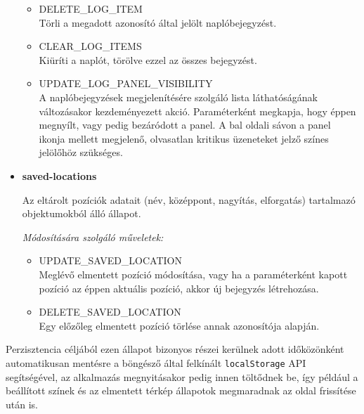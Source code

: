 \begin{itemize}
\begin{itemize}
      \item DELETE\_LOG\_ITEM \\
        Törli a megadott azonosító által jelölt naplóbejegyzést.

      \item CLEAR\_LOG\_ITEMS \\
        Kiüríti a naplót, törölve ezzel az összes bejegyzést.

      \item UPDATE\_LOG\_PANEL\_VISIBILITY \\
        A naplóbejegyzések megjelenítésére szolgáló lista láthatóságának
        változásakor kezdeményezett akció. Paraméterként megkapja, hogy éppen
        megnyílt, vagy pedig bezáródott a panel.
        A bal oldali sávon a panel ikonja mellett megjelenő, olvasatlan kritikus
        üzeneteket jelző színes jelölőhöz szükséges.

    \end{itemize}

  \item \textbf{saved-locations}

    Az eltárolt pozíciók adatait (név, középpont, nagyítás, elforgatás)
    tartalmazó objektumokból álló állapot.

    \textit{Módosítására szolgáló műveletek:}

    \begin{itemize}
      \item UPDATE\_SAVED\_LOCATION \\
        Meglévő elmentett pozíció módosítása, vagy ha a paraméterként kapott
        pozíció az éppen aktuális pozíció, akkor új bejegyzés létrehozása.

      \item DELETE\_SAVED\_LOCATION \\
        Egy előzőleg elmentett pozíció törlése annak azonosítója alapján.
    \end{itemize}

\end{itemize}

\noindent Perzisztencia céljából ezen állapot bizonyos részei kerülnek adott időközönként
automatikusan mentésre a böngésző által felkínált \verb|localStorage| API
segítségével, az alkalmazás megnyitásakor pedig innen töltődnek be, így például
a beállított színek és az elmentett térkép állapotok megmaradnak az oldal
frissítése után is.
